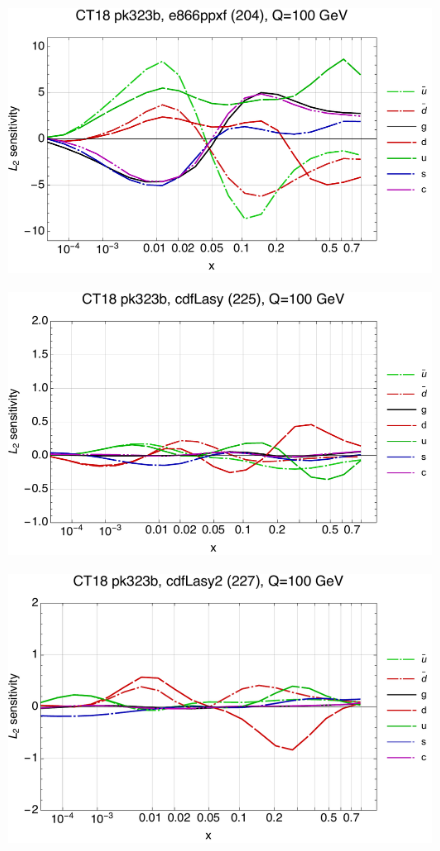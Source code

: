 \documentclass[10pt,aps,prd,floatfix,titlepage]{revtex4}
\begin{document}
\begin{figure}
\includegraphics[width=\textwidth,height=0.44\textheight,keepaspectratio]{1/204_ct18nn_L2_q100_Sf_1.pdf}
\caption{}
\end{figure}
\clearpage
\begin{figure}
\includegraphics[width=\textwidth,height=0.44\textheight,keepaspectratio]{1/225_ct18nn_L2_q100_Sf_1.pdf}
\caption{}
\end{figure}
\begin{figure}
\includegraphics[width=\textwidth,height=0.44\textheight,keepaspectratio]{1/227_ct18nn_L2_q100_Sf_1.pdf}
\caption{}
\end{figure}
\end{document}
